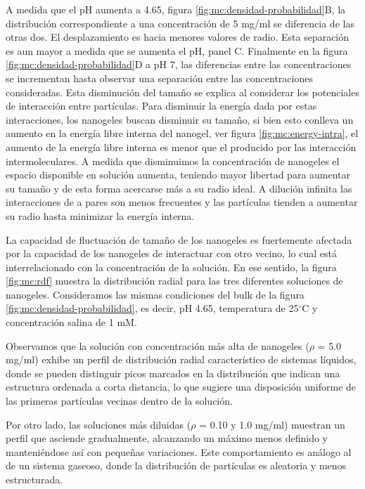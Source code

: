 	A medida que el pH aumenta a 4.65, figura \ref{fig:mc:densidad-probabilidad}B, la distribuci\'on correspondiente a una concentraci\'on de 5 mg/ml se diferencia de las otras dos. El desplazamiento es hacia menores valores de radio. Esta separaci\'on es aun mayor a medida que se aumenta el pH, panel C. Finalmente en la figura \ref{fig:mc:densidad-probabilidad}D a pH 7, las diferencias entre las concentraciones se incrementan hasta observar una separaci\'on entre las concentraciones consideradas. Esta disminuci\'on del tama\~no se explica al considerar los potenciales de interacci\'on entre part\'iculas. Para disminuir la energ\'ia dada por estas interacciones, los nanogeles buscan disminuir su tama\~no, si bien esto conlleva un aumento en la energ\'ia libre interna del nanogel, ver figura \ref{fig:mc:energy-intra}, el aumento de la energ\'ia libre interna es menor que el producido por las interacci\'on intermoleculares. A medida que disminuimos la concentraci\'on de nanogeles el espacio disponible en soluci\'on aumenta, teniendo mayor libertad para  aumentar su tama\~no y de esta forma acercarse m\'as a su radio ideal. A  diluci\'on infinita las  interacciones de a pares son menos frecuentes y las part\'iculas tienden a aumentar su radio hasta minimizar la energ\'ia interna.
	
	La capacidad de fluctuaci\'on de tama\~no de los nanogeles es fuertemente afectada por la capacidad de los nanogeles de interactuar con otro vecino, lo cual est\'a interrelacionado con la concentraci\'on de la soluci\'on.
	En ese sentido, la figura \ref{fig:mc:rdf} muestra la distribuci\'on radial para las tres diferentes soluciones de nanogeles. Consideramos las mismas condiciones del bulk de la figura \ref{fig:mc:densidad-probabilidad}, es decir, pH 4.65, temperatura de 25$^\circ$C y concentraci\'on salina de 1 mM.
	
	Observamos que la soluci\'on con concentraci\'on m\'as alta de nanogeles ($\rho$ = 5.0 mg/ml) exhibe un perfil de distribuci\'on radial caracter\'istico de sistemas l\'iquidos, donde se pueden distinguir picos marcados en la distribuci\'on que indican una estructura ordenada a corta distancia, lo que sugiere una disposici\'on uniforme de las primeras part\'iculas vecinas dentro de la soluci\'on.
	
	Por otro lado, las soluciones m\'as diluidas ($\rho$ = 0.10 y 1.0 mg/ml) muestran un perfil que asciende gradualmente, alcanzando un m\'aximo menos definido y manteni\'endose as\'i con peque\~nas variaciones. Este comportamiento es an\'alogo al de un sistema gaseoso, donde la distribuci\'on de part\'iculas es  aleatoria y menos estructurada.
	
